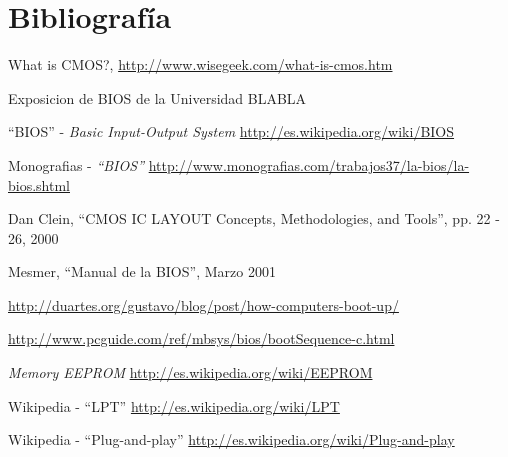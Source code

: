 \section{Bibliografía}
\begin{thebibliography}{99}\label{sec:bibliografia}

		What is CMOS?,
		\url{http://www.wisegeek.com/what-is-cmos.htm}

		Exposicion de BIOS de la Universidad BLABLA

		``BIOS'' - {\em Basic Input-Output System}
		\url{http://es.wikipedia.org/wiki/BIOS}

		Monografias - {\em ``BIOS''}
		\url{http://www.monografias.com/trabajos37/la-bios/la-bios.shtml}

		Dan Clein, ``CMOS IC LAYOUT Concepts, Methodologies, and Tools'', pp. 22 - 26, 2000

		Mesmer, ``Manual de la BIOS'', Marzo 2001
	
		\url{http://duartes.org/gustavo/blog/post/how-computers-boot-up/}
	
		\url{http://www.pcguide.com/ref/mbsys/bios/bootSequence-c.html}

		{\em Memory EEPROM}
		\url{http://es.wikipedia.org/wiki/EEPROM}
	
		Wikipedia - ``LPT''
		\url{http://es.wikipedia.org/wiki/LPT}

		Wikipedia - ``Plug-and-play''
		\url{http://es.wikipedia.org/wiki/Plug-and-play}

\end{thebibliography}
